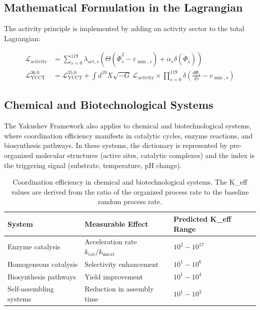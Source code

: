 \documentclass[11pt,a4paper]{article}
\begin{document}
\subsection{Mathematical Formulation in the Lagrangian}

The activity principle is implemented by adding an activity sector to the total Lagrangian:

\begin{align}
	\mathcal{L}_{\mathrm{activity}} &= \sum_{s=0}^{119} \lambda_{\mathrm{act},s} \left( \Theta(\dot{\Phi}_s^2 - \varepsilon_{\min,s}) + \alpha_s \delta(\dot{\Phi}_s) \right) \\
	\mathcal{L}_{\mathrm{YUCT}}^{36.0} &= \mathcal{L}_{\mathrm{YUCT}}^{35.0} + \int d^{19}X \sqrt{-G} \, \mathcal{L}_{\mathrm{activity}} \times \prod_{s=0}^{119} \delta\left( \frac{d\Phi_s}{d\tau} - v_{\min,s} \right)
\end{align}

\subsection{Chemical and Biotechnological Systems}
\label{subsec:chemical-systems}

The Yakushev Framework also applies to chemical and biotechnological systems, where coordination efficiency manifests in catalytic cycles, enzyme reactions, and biosynthesis pathways. In these systems, the dictionary is represented by pre-organized molecular structures (active sites, catalytic complexes) and the index is the triggering signal (substrate, temperature, pH change).

\begin{table}[htbp]
	\centering
	\small
	\begin{tabular}{p{}p{}p{}}
		\toprule
		\textbf{System} & \textbf{Measurable Effect} & \textbf{Predicted K\_eff Range} \\
		\midrule
		Enzyme catalysis & Acceleration rate $k_{\text{cat}}/k_{\text{uncat}}$ & $10^2 - 10^{17}$ \\
		Homogeneous catalysis & Selectivity enhancement & $10^1 - 10^6$ \\
		Biosynthesis pathways & Yield improvement & $10^1 - 10^4$ \\
		Self-assembling systems & Reduction in assembly time & $10^1 - 10^3$ \\
		\bottomrule
	\end{tabular}
	\caption{Coordination efficiency in chemical and biotechnological systems. The K\_eff values are derived from the ratio of the organized process rate to the baseline random process rate.}
	\label{tab:chemical-keff}
\end{table}
\end{document}
